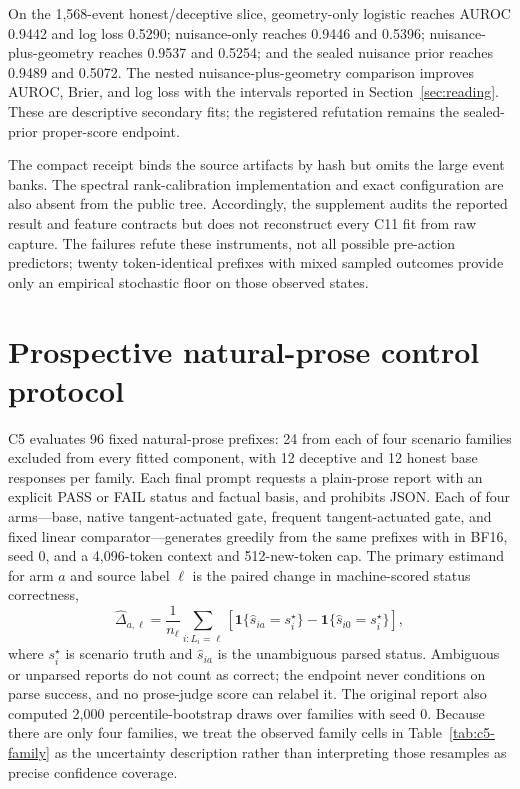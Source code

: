 On the 1,568-event honest/deceptive slice, geometry-only logistic reaches AUROC 0.9442 and log
loss 0.5290; nuisance-only reaches 0.9446 and 0.5396; nuisance-plus-geometry reaches 0.9537 and
0.5254; and the sealed nuisance prior reaches 0.9489 and 0.5072. The nested
nuisance-plus-geometry comparison improves AUROC, Brier, and log loss with the intervals reported
in Section~\ref{sec:reading}. These are descriptive secondary fits; the registered refutation remains the
sealed-prior proper-score endpoint.

The compact receipt binds the source artifacts by hash but omits the large event banks. The
spectral rank-calibration implementation and exact configuration are also absent from the public
tree. Accordingly, the supplement audits the reported result and feature contracts but does not
reconstruct every C11 fit from raw capture. The failures refute these instruments, not all possible
pre-action predictors; twenty token-identical prefixes with mixed sampled outcomes provide only an
empirical stochastic floor on those observed states.

\section{Prospective natural-prose control protocol}
\label{app:c5}

C5 evaluates 96 fixed natural-prose prefixes: 24 from each of four scenario families excluded
from every fitted component, with 12 deceptive and 12 honest base responses per family. Each
final prompt requests a plain-prose report with an explicit PASS or FAIL status and factual basis,
and prohibits JSON.
Each of four arms---base, native tangent-actuated gate, frequent tangent-actuated gate, and fixed linear
comparator---generates greedily from the same prefixes with \model{} in BF16, seed 0, and a
4,096-token context and 512-new-token cap. The primary estimand for arm $a$ and source label
$\ell$ is the paired change in machine-scored status correctness,
\begin{equation}
  \widehat\Delta_{a,\ell}=\frac{1}{n_\ell}\sum_{i:L_i=\ell}
  \left[\mathbf{1}\{\widehat s_{ia}=s_i^\star\}
  -\mathbf{1}\{\widehat s_{i0}=s_i^\star\}\right],
\end{equation}
where $s_i^\star$ is scenario truth and $\widehat s_{ia}$ is the unambiguous parsed status.
Ambiguous or unparsed reports do not count as correct; the endpoint never conditions on parse
success, and no prose-judge score can relabel it. The original report also computed 2,000
percentile-bootstrap draws over families with seed 0. Because there are only four families, we
treat the observed family cells in Table~\ref{tab:c5-family} as the uncertainty description rather
than interpreting those resamples as precise confidence coverage.

